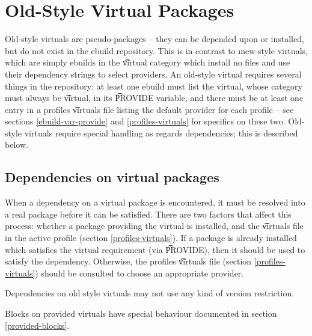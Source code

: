 \chapter{Old-Style Virtual Packages}
\label{old-virtuals}

Old-style virtuals are pseudo-packages -- they can be depended upon or installed, but do not exist
in the ebuild repository. This is in contrast to \i{new-style} virtuals, which are simply ebuilds in
the \t{virtual} category which install no files and use their dependency strings to select
providers. An old-style virtual requires several things in the repository: at least
one ebuild must list the virtual, whose category must always be \t{virtual}, in its \t{PROVIDE}
variable, and there must be at least one entry in a profiles \t{virtuals} file listing the default
provider for each profile -- see sections \ref{ebuild-var-provide} and \ref{profiles-virtuals} for
specifics on these two. Old-style virtuals require special handling as regards dependencies; this is
described below.

\section{Dependencies on virtual packages}

When a dependency on a virtual package is encountered, it must be resolved into a real package
before it can be satisfied. There are two factors that affect this process: whether a package
providing the virtual is installed, and the \t{virtuals} file in the active profile (section
\ref{profiles-virtuals}). If a package is already installed which satisfies the virtual requirement
(via \t{PROVIDE}), then it should be used to satisfy the dependency. Otherwise, the profiles
\t{virtuals} file (section \ref{profiles-virtuals}) should be consulted to choose an appropriate
provider.

Dependencies on old style virtuals may not use any kind of version restriction.

Blocks on provided virtuals have special behaviour documented in section \ref{provided-blocks}.

